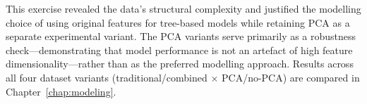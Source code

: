 This exercise revealed the data's structural complexity and justified the modelling choice of using original features for tree-based models while retaining PCA as a separate experimental variant. The PCA variants serve primarily as a robustness check---demonstrating that model performance is not an artefact of high feature dimensionality---rather than as the preferred modelling approach. Results across all four dataset variants (traditional/combined $\times$ PCA/no-PCA) are compared in Chapter~\ref{chap:modeling}.
